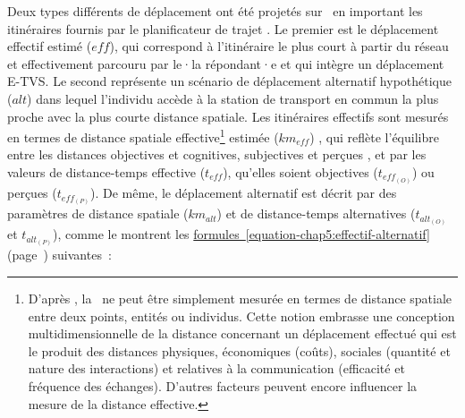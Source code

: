 \begin{refsegment}
Deux types différents de déplacement ont été projetés sur ~en important les itinéraires fournis par le planificateur de trajet . Le premier est le déplacement effectif estimé (\(eff\)), qui correspond à l'itinéraire le plus court à partir du réseau et effectivement parcouru par le·la répondant·e et qui intègre un déplacement \acrshort{E-TVS}. Le second représente un scénario de déplacement alternatif hypothétique (\(alt\)) dans lequel l'individu accède à la station de transport en commun la plus proche avec la plus courte distance spatiale. Les itinéraires effectifs sont mesurés en termes de distance spatiale effective\footnote{
    D'après \textcolor{blue}{\textcite[308]{deutsch_note_1961}}, la ~ne peut être simplement mesurée en termes de distance spatiale entre deux points, entités ou individus. Cette notion embrasse une conception multidimensionnelle de la distance concernant un déplacement effectué qui est le produit des distances physiques, économiques (coûts), sociales (quantité et nature des interactions) et relatives à la communication (efficacité et fréquence des échanges). D'autres facteurs peuvent encore influencer la mesure de la distance effective.
} estimée (\(km_{eff}\)) \textcolor{blue}{\autocite[34]{cauvin-reymond_perception_1984}}, qui reflète l'équilibre entre les distances objectives \textcolor{blue}{\autocite{brigss_methodologies_1976}} et cognitives, subjectives et perçues \textcolor{blue}{\autocite{canter_psychology_1977, bailly_perception_1977, sadalla_perception_1980}}, et par les valeurs de distance-temps effective (\(t_{eff}\)), qu'elles soient objectives (\(t_{eff_{(O)}}\)) ou perçues (\(t_{eff_{(P)}}\)). De même, le déplacement alternatif est décrit par des paramètres de distance spatiale (\(km_{alt}\)) et de distance-temps alternatives (\(t_{alt_{(O)}}\) et \(t_{alt_{(P)}}\)), comme le montrent les \hyperref[equation-chap5:effectif-alternatif]{formules~\ref{equation-chap5:effectif-alternatif}} (page~\pageref{equation-chap5:effectif-alternatif}) suivantes~:%


\end{refsegment}

